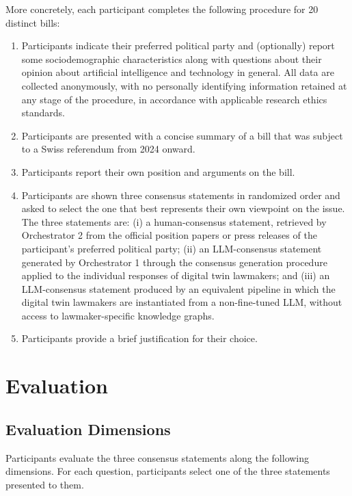 \documentclass[11pt]{article}
\begin{document}
More concretely, each participant completes the following procedure for 20 distinct bills:
\begin{enumerate}

\item Participants indicate their preferred political party and (optionally) report some sociodemographic characteristics along with questions about their opinion about artificial intelligence and technology in general. All data are collected anonymously, with no personally identifying information retained at any stage of the procedure, in accordance with applicable research ethics standards.

\item Participants are presented with a concise summary of a bill that was subject to a Swiss referendum from 2024 onward.

\item Participants report their own position and arguments on the bill.

\item Participants are shown three consensus statements in randomized order and asked to select the one that best represents their own viewpoint on the issue. The three statements are: (i) a human-consensus statement, retrieved by Orchestrator 2 from the official position papers or press releases of the participant's preferred political party; (ii) an LLM-consensus statement generated by Orchestrator 1 through the consensus generation procedure applied to the individual responses of digital twin lawmakers; and (iii) an LLM-consensus statement produced by an equivalent pipeline in which the digital twin lawmakers are instantiated from a non-fine-tuned LLM, without access to lawmaker-specific knowledge graphs.

\item Participants provide a brief justification for their choice.

\end{enumerate}


\section{Evaluation}

\subsection{Evaluation Dimensions}

Participants evaluate the three consensus statements along the following 
dimensions. For each question, participants select one of the three 
statements presented to them.
\end{document}
